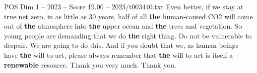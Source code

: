 \begin{textsample}{POS Dim 1 – 2023 – Score 19.00 – 2023/t003440.txt}
Even better, if we stay at true net zero, in as little as 30 years, half of all \textbf{the} human-caused CO2 will come out of \textbf{the} atmosphere into \textbf{the} upper ocean and \textbf{the} trees and vegetation.
So young people are demanding that we do \textbf{the} right thing.
Do not be vulnerable to despair.
We are going to do this.
And if you doubt that we, as human beings have \textbf{the} will to act, please always remember that \textbf{the} will to act is itself a \textbf{renewable} resource.
Thank you very much.
Thank you.

\end{textsample}
